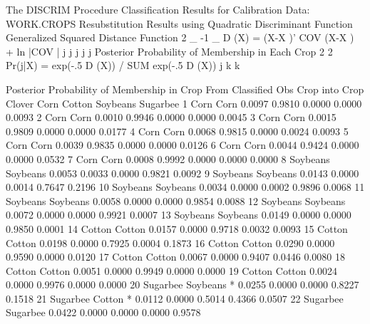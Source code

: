 \documentclass{article}
\begin{document}
\begin{Woutput}
The DISCRIM Procedure
Classification Results for Calibration Data: WORK.CROPS
Resubstitution Results using Quadratic Discriminant Function
Generalized Squared Distance Function
 2         _       -1   _
D (X) = (X-X )' COV  (X-X ) + ln |COV |
 j          j      j     j           j
Posterior Probability of Membership in Each Crop
                   2                    2
Pr(j|X) = exp(-.5 D (X)) / SUM exp(-.5 D (X))
                   j        k           k

                       Posterior Probability of Membership in Crop
       From        Classified
Obs    Crop        into Crop       Clover        Corn      Cotton    Soybeans    Sugarbee
  1    Corn        Corn            0.0097      0.9810      0.0000      0.0000      0.0093
  2    Corn        Corn            0.0010      0.9946      0.0000      0.0000      0.0045
  3    Corn        Corn            0.0015      0.9809      0.0000      0.0000      0.0177
  4    Corn        Corn            0.0068      0.9815      0.0000      0.0024      0.0093
  5    Corn        Corn            0.0039      0.9835      0.0000      0.0000      0.0126
  6    Corn        Corn            0.0044      0.9424      0.0000      0.0000      0.0532
  7    Corn        Corn            0.0008      0.9992      0.0000      0.0000      0.0000
  8    Soybeans    Soybeans        0.0053      0.0033      0.0000      0.9821      0.0092
  9    Soybeans    Soybeans        0.0143      0.0000      0.0014      0.7647      0.2196
 10    Soybeans    Soybeans        0.0034      0.0000      0.0002      0.9896      0.0068
 11    Soybeans    Soybeans        0.0058      0.0000      0.0000      0.9854      0.0088
 12    Soybeans    Soybeans        0.0072      0.0000      0.0000      0.9921      0.0007
 13    Soybeans    Soybeans        0.0149      0.0000      0.0000      0.9850      0.0001
 14    Cotton      Cotton          0.0157      0.0000      0.9718      0.0032      0.0093
 15    Cotton      Cotton          0.0198      0.0000      0.7925      0.0004      0.1873
 16    Cotton      Cotton          0.0290      0.0000      0.9590      0.0000      0.0120
 17    Cotton      Cotton          0.0067      0.0000      0.9407      0.0446      0.0080
 18    Cotton      Cotton          0.0051      0.0000      0.9949      0.0000      0.0000
 19    Cotton      Cotton          0.0024      0.0000      0.9976      0.0000      0.0000
 20    Sugarbee    Soybeans *      0.0255      0.0000      0.0000      0.8227      0.1518
 21    Sugarbee    Cotton   *      0.0112      0.0000      0.5014      0.4366      0.0507
 22    Sugarbee    Sugarbee        0.0422      0.0000      0.0000      0.0000      0.9578

\end{Woutput}
\end{document}
